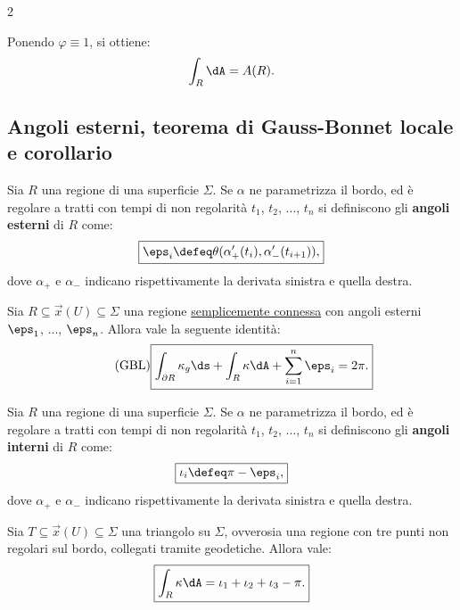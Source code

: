 \begin{multicols*}{2}
    \begin{remark}
        Ponendo $\varphi \equiv 1$, si ottiene:
        \[
            \int_R \dA = A(R).
        \]
    \end{remark}

    \subsection{Angoli esterni, teorema di Gauss-Bonnet locale e corollario}

    \begin{definition}
        Sia $R$ una regione di una superficie $\Sigma$. Se $\alpha$ ne
        parametrizza il bordo, ed è regolare a tratti con tempi
        di non regolarità $t_1$, $t_2$, ..., $t_n$ si definiscono
        gli \textbf{angoli esterni} di $R$ come:
        \[
            \boxed{\eps_i \defeq \theta(\alpha_+'(t_i), \alpha_-'(t_{i+1})),}
        \]
        dove $\alpha_+$ e $\alpha_-$ indicano rispettivamente la
        derivata sinistra e quella destra.
    \end{definition}

    \begin{theorem} \label{thm:GBL}
        Sia $R \subseteq \vec{x}(U) \subseteq \Sigma$ una regione
        \underline{semplicemente connessa} con angoli esterni
        $\eps_1$, ..., $\eps_n$. Allora vale la seguente identità:
        \begin{equation*} \tag{GBL} \label{eq:GBL}
            \boxed{\int_{\partial R} \kappa_g \ds + \int_R \kappa \dA + \sum_{i=1}^n \eps_i = 2\pi.}
        \end{equation*}
    \end{theorem}

    \begin{definition}
        Sia $R$ una regione di una superficie $\Sigma$. Se $\alpha$ ne
        parametrizza il bordo, ed è regolare a tratti con tempi
        di non regolarità $t_1$, $t_2$, ..., $t_n$ si definiscono
        gli \textbf{angoli interni} di $R$ come:
        \[
            \boxed{\iota_i \defeq \pi - \eps_i,}
        \]
        dove $\alpha_+$ e $\alpha_-$ indicano rispettivamente la
        derivata sinistra e quella destra.
    \end{definition}

    \begin{corollary} \label{cor:angoli_triangolo}
        Sia $T \subseteq \vec{x}(U) \subseteq \Sigma$ una triangolo
        su $\Sigma$, ovverosia una regione con tre punti non regolari sul
        bordo, collegati tramite geodetiche. Allora vale:
        \[
            \boxed{\int_R \kappa \dA = \iota_1 + \iota_2 + \iota_3 - \pi.}
        \]
    \end{corollary}


\end{multicols*}
